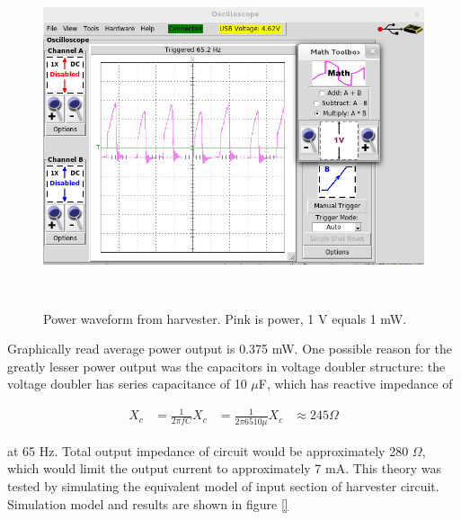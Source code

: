\begin{figure}[htb]
\begin{center}
\includegraphics[height=10cm]{images/own_measurement/generator_shaker/inductive_td_harvesting_power_65Hz_ferro.png}
\end{center}
\caption{\label{fig:inductive_power_65} Power waveform from harvester. Pink is power, 1 V equals 1 mW.}
\end{figure}

Graphically read average power output is 0.375 mW. One possible reason for the greatly lesser power output was the capacitors in voltage doubler structure: the voltage doubler has series capacitance of 10 $\mu$F, which has reactive impedance of

\begin{align}
  X_c& = \frac{1}{2 \pi f C}
  X_c& = \frac{1}{2 \pi 65 10\mu}
  X_c& \approx 245 \Omega
\end{align}

at 65 Hz. Total output impedance of circuit would be approximately 280 $\Omega$, which would limit the output current to approximately 7 mA. This theory was tested by simulating the equivalent model of input section of harvester circuit. Simulation model and results are shown in figure \ref{}

